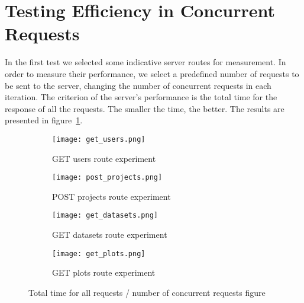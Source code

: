 \section{Testing Efficiency in Concurrent Requests}
In the first test we selected some indicative server routes for measurement. In order to measure their performance, we select a predefined number of requests to be sent to the server, changing the number of concurrent requests in each iteration. The criterion of the server's performance is the total time for the response of all the requests. The smaller the time, the better. The results are presented in figure~\ref{experiment_fig}. \par 
 
\begin{figure}
\centering
\begin{subfigure}{1\textwidth}
  \centering
  \centerline{\texttt{[image: get\_users.png]}}
  \caption{GET users route experiment}
\end{subfigure}
\begin{subfigure}{1\textwidth}
  \centering
  \centerline{\texttt{[image: post\_projects.png]}}
  \caption{POST projects route experiment}
\end{subfigure}
\begin{subfigure}{1\textwidth}
  \centering
  \centerline{\texttt{[image: get\_datasets.png]}}
  \caption{GET datasets route experiment}
\end{subfigure}
\begin{subfigure}{1\textwidth}
  \centering
  \centerline{\texttt{[image: get\_plots.png]}}
  \caption{GET plots route experiment}
\end{subfigure}
\caption{Total time for all requests / number of concurrent requests figure}
\label{experiment_fig}
\end{figure}


